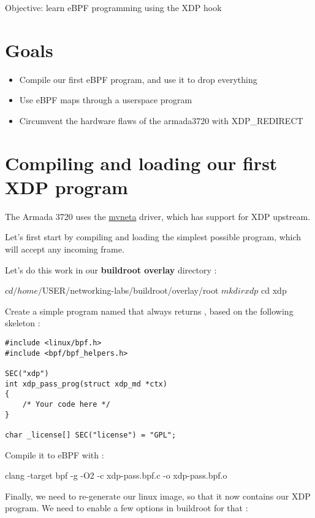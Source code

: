 {Objective: learn eBPF programming using the XDP hook}

\section{Goals}

 \begin{itemize}
 \item Compile our first eBPF program, and use it to drop everything
 \item Use eBPF maps through a userspace program
 \item Circumvent the hardware flaws of the armada3720 with XDP\_REDIRECT
 \end{itemize}

\section{Compiling and loading our first XDP program}

The Armada 3720 uses the \href{tod}{mvneta} driver, which has support for XDP upstream.

Let's first start by compiling and loading the simplest possible program, which
will accept any incoming frame.

Let's do this work in our \textbf{buildroot overlay} directory :

\begin{hostbashinput}
$ cd /home/$USER/networking-labs/buildroot/overlay/root
$ mkdir xdp
$ cd xdp
\end{hostbashinput}

Create a simple program named  that always returns , based on the following
skeleton :

\begin{verbatim}
#include <linux/bpf.h>
#include <bpf/bpf_helpers.h>

SEC("xdp")
int xdp_pass_prog(struct xdp_md *ctx)
{
	/* Your code here */
}

char _license[] SEC("license") = "GPL";
\end{verbatim}

Compile it to eBPF with  :

\begin{hostbashinput}
clang -target bpf -g -O2 -c xdp-pass.bpf.c -o xdp-pass.bpf.o
\end{hostbashinput}

Finally, we need to re-generate our linux image, so that it now contains our XDP
program. We need to enable a few options in buildroot for that :

